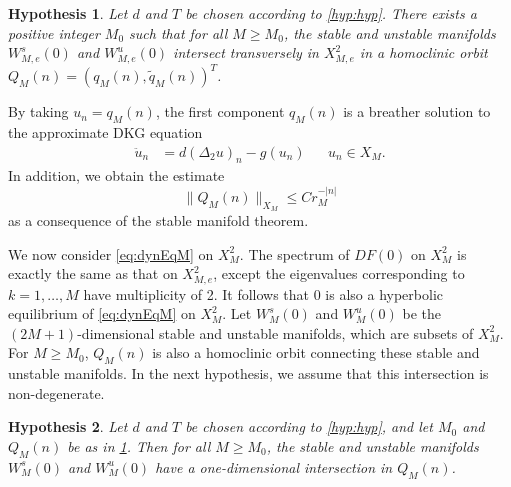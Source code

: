 \documentclass[12pt,reqno]{amsart}
\newtheorem{hypothesis}{Hypothesis}
\begin{document}
\begin{hypothesis}\label{hyp:breather}
Let $d$ and $T$ be chosen according to \cref{hyp:hyp}. There exists a positive integer $M_0$ such that for all $M \geq M_0$, the stable and unstable manifolds $W_{M,e}^s(0)$ and $W_{M,e}^u(0)$ intersect transversely in $X_{M,e}^2$ in a homoclinic orbit $Q_M(n) = (q_M(n), \tilde{q}_M(n))^T$. 
\end{hypothesis}
By taking $u_n = q_M(n)$, the first component $q_M(n)$ is a breather solution to the approximate DKG equation
\begin{equation}\label{eq:DKGapprox}
\begin{aligned}
\ddot{u}_n &= d (\Delta_2 u)_n - g(u_n) && u_n \in X_M.
\end{aligned}
\end{equation}
In addition, we obtain the estimate 
\begin{equation}\label{eq:U1decayest}
\|Q_M(n)\|_{X_M} \leq C r_M^{-|n|}
\end{equation}
as a consequence of the stable manifold theorem.

We now consider \cref{eq:dynEqM} on $X_M^2$. The spectrum of $DF(0)$ on $X_M^2$ is exactly the same as that on $X_{M,e}^2$, except the eigenvalues corresponding to $k = 1, \dots, M$ have multiplicity of 2. It follows that 0 is also a hyperbolic equilibrium of \cref{eq:dynEqM} on $X_M^2$. Let $W_M^s(0)$ and $W_M^u(0)$ be the $(2M+1)$-dimensional stable and unstable manifolds, which are subsets of $X_M^2$. For $M \geq M_0$, $Q_M(n)$ is also a homoclinic orbit connecting these stable and unstable manifolds. In the next hypothesis, we assume that this intersection is non-degenerate.

\begin{hypothesis}\label{hyp:breathernondegen}
Let $d$ and $T$ be chosen according to \cref{hyp:hyp}, and let $M_0$ and $Q_M(n)$ be as in \cref{hyp:breather}. Then for all $M \geq M_0$, the stable and unstable manifolds $W_M^s(0)$ and $W_M^u(0)$ have a one-dimensional intersection in $Q_M(n)$.
\end{hypothesis}
\end{document}
